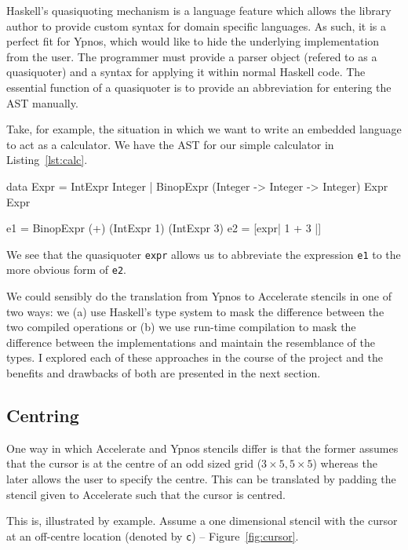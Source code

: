 \documentclass[12pt,a4paper,twoside]{scrbook}
\begin{document}
Haskell's quasiquoting mechanism is a language feature which allows the library
author to provide custom syntax for domain specific languages.  As such, it is a
perfect fit for Ypnos, which would like to hide the underlying implementation
from the user. The programmer must provide a parser object (refered to as a
quasiquoter) and a syntax for applying it within normal Haskell code. The
essential function of a quasiquoter is to provide an abbreviation for entering
the AST manually.

Take, for example, the situation in which we want to write an embedded
language to act as a calculator. We have the AST for our
simple calculator in Listing~\ref{lst:calc}.

\begin{hflisting}[label={lst:calc}, caption={A simple calculator defined using an
  AST (\texttt{Expr}) and using a quasiquoter for abbreviated syntax. The definition of
  \texttt{expr} is omitted.}]
data Expr  =  IntExpr Integer
           |  BinopExpr (Integer -> Integer -> Integer) Expr Expr

e1 = BinopExpr (+) (IntExpr 1) (IntExpr 3)
e2 = [expr| 1 + 3 |]
\end{hflisting}

We see that the quasiquoter \texttt{expr} allows us to abbreviate the expression
\texttt{e1} to the more obvious form of \texttt{e2}.

We could sensibly do the translation from Ypnos to Accelerate stencils in one of
two ways: we (a) use Haskell's type system to mask the difference between the
two compiled operations or (b) we use run-time compilation to mask the
difference between the implementations and maintain the resemblance of the
types. I explored each of these approaches in the course of the project and the
benefits and drawbacks of both are presented in the next section.

\subsection{Centring}
\label{sec:centring}

One way in which Accelerate and Ypnos stencils differ is that the former assumes
that the cursor is at the centre of an odd sized grid ($3 \times 5, 5 \times 5$)
whereas the later allows the user to specify the centre. This can be translated
by padding the stencil given to Accelerate such that the cursor is centred.

This is, illustrated by example. Assume a one dimensional stencil with the
cursor at an off-centre location (denoted by \texttt{c}) --
Figure~\ref{fig:cursor}.
\end{document}
